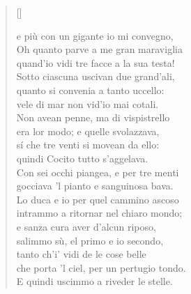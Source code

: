 \documentclass{article}
\begin{document}
\begin{verse}[\versewidth]
\begin{patverse*}
    e più con un gigante io mi convegno,\\
    Oh quanto parve a me gran maraviglia\\
    quand'io vidi tre facce a la sua testa!\\
    Sotto ciascuna uscivan due grand'ali,\\
    quanto si convenia a tanto uccello:\\
    vele di mar non vid'io mai cotali.\\
    Non avean penne, ma di vispistrello\\
    era lor modo; e quelle svolazzava,\\
    sí che tre venti si movean da ello:\\
    quindi Cocito tutto s'aggelava.\\
    Con sei occhi piangea, e per tre menti\\
    gocciava 'l pianto e sanguinosa bava.\\
    Lo duca e io per quel cammino ascoso\\
    intrammo a ritornar nel chiaro mondo;\\
    e sanza cura aver d'alcun riposo,\\
    salimmo sù, el primo e io secondo,\\
    tanto ch'i' vidi de le cose belle\\
    che porta 'l ciel, per un pertugio tondo.\\
    E quindi uscimmo a riveder le stelle.
  \end{patverse*}
\end{verse}

\settowidth{\versewidth}{There was an old party of Lyme}
\end{document}
